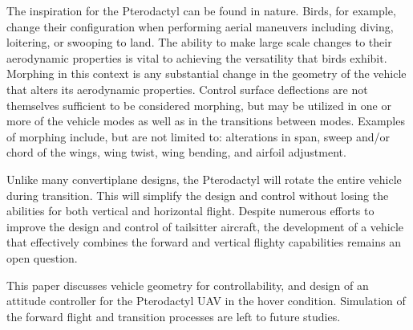\documentclass[]{aiaa-tc}%
\begin{document}
The inspiration for the Pterodactyl can be found in nature. Birds, for example, change their configuration when performing aerial maneuvers including diving, loitering, or swooping to land. The ability to make large scale changes to their aerodynamic properties is vital to achieving the versatility that birds exhibit. Morphing in this context is any substantial change in the geometry of the vehicle that alters its aerodynamic properties.\cite{Barbarino:2011} Control surface deflections are not themselves sufficient to be considered morphing, but may be utilized in one or more of the vehicle modes as well as in the transitions between modes.\cite{Wickenheiser:2008} Examples of morphing include, but are not limited to: alterations in span, sweep and/or chord of the wings, wing twist, wing bending, and airfoil adjustment.

Unlike many convertiplane designs, the Pterodactyl will rotate the entire vehicle during transition. This will simplify the design and control without losing the abilities for both vertical and horizontal flight.\cite{Stone:2008} Despite numerous efforts to improve the design and control of tailsitter aircraft, the development of a vehicle that effectively combines the forward and vertical flighty capabilities remains an open question.\cite{Escareno:2007}\cite{Matsumoto:2010}

This paper discusses vehicle geometry for controllability, and design of an attitude controller for the
Pterodactyl UAV in the hover condition. Simulation of the forward flight and transition processes are left to future studies.
\end{document}
